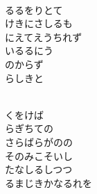 \documentclass[10pt,b5j]{tarticle} %
\begin{document}
\begin{enumerate}
\begin{minipage}[c]{\blocksize}
        \vspace{\linespace}
        \item~\\
        るるをりとて\\
        けきにさしるも\\
        にえてえうちれず\\
        いるるにう\\
        のからず\\
        らしきと
        
        \vspace{\linespace}
        \item~\\
        くをけば\\
        らぎちての\\
        さらばらがのの\\
        そのみこそいし\\
        たなしるしつつ\\
        るまじきかなるれを
    
    \end{minipage}
\end{enumerate} %
\end{document}
